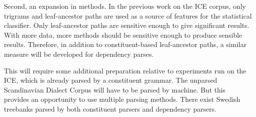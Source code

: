 \documentclass[11pt]{article}
\begin{document}
Second, an expansion in methods. In the previous work on the ICE
corpus, only trigrams and leaf-ancestor paths are used as a source of
features for the statistical classifier. Only leaf-ancestor paths are
sensitive enough to give significant results. With more data, more
methods should be sensitive enough to produce sensible
results. Therefore, in addition to constituent-based leaf-ancestor
paths, a similar measure will be developed for dependency parses.

This will require some additional preparation relative to experiments
run on the ICE, which is already parsed by a constituent grammar. The
unparsed Scandinavian Dialect Corpus will have to be parsed by
machine. But this provides an opportunity to use multiple parsing
methods. There exist Swedish treebanks parsed by both constituent parsers and
dependency parsers.



\end{document}

